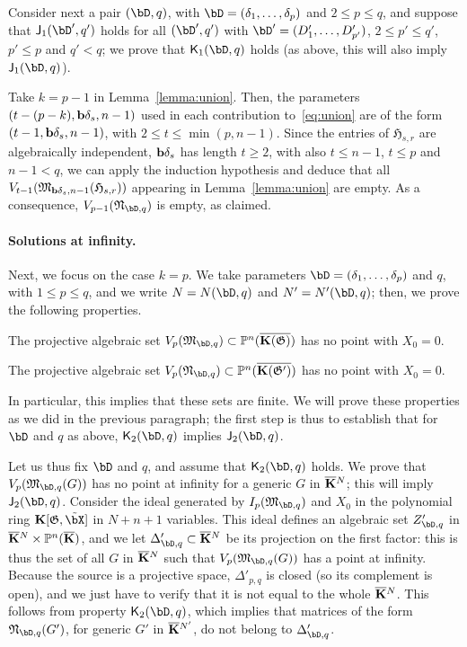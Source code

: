 \documentclass[12pt]{article}
\begin{document}
Consider next a pair $(\bD,q)$, with $\bD=(\delta_1,\dots,\delta_p)$ and $2 \le
p \le q$, and suppose that $\assI_1(\bD',q')$ holds for all
$(\bD',q')$ with $\bD'=(D'_1,\dots,D'_{p'})$, $2 \le p' \le q'$, $p'
\le p$ and $q' < q$; we prove that $\assJ_1(\bD,q)$ holds
(as above, this will also imply $\assI_1(\bD,q)$).

Take $k=p-1$ in Lemma~\ref{lemma:union}. Then, the parameters
$(t-(p-k),\mathbf{b}\delta_s,n-1)$ used in each contribution to~\eqref{eq:union}
are of the form $(t-1,\mathbf{b}\delta_s,n-1)$, with $2 \le t \le \min(p,n-1)$.
Since the entries of $\mathfrak{H}_{s,r}$ are algebraically
independent, $\mathbf{b}\delta_s$ has length $t\ge 2$, with also $t \le n-1$, $t
\le p$ and $n-1 < q$, we can apply the induction hypothesis and deduce
that all $V_{t-1}(\mathfrak{M}_{\mathbf{b}\delta_s,n-1}(\mathfrak{H}_{s,r}))$
appearing in Lemma~\ref{lemma:union} are empty. As a consequence,
$V_{p-1}(\mathfrak{N}_{\bD,q})$ is empty, as claimed.


\paragraph{Solutions at infinity.} Next, we focus on the case $k=p$.
We take parameters $\bD=(\delta_1,\dots,\delta_p)$ and $q$, with $1 \le p \le
q$, and we write $N=N(\bD,q)$ and $N'=N'(\bD,q)$; then, we prove the following properties.
\begin{description}[leftmargin=*]
\item[$\assI_2(\bD,q).$] The projective algebraic set
  $V_p(\mathfrak{M}_{\bD,q}) \subset \P^n(\KKGbar)$ has no point with $X_0=0$.
\item[$\assJ_2(\bD,q).$] The projective algebraic set
  $V_p(\mathfrak{N}_{\bD,q}) \subset \P^n(\KKGpbar)$ has no point with $X_0=0$.
\end{description}
 In particular, this implies that these sets are finite. We will prove
 these properties as we did in the previous paragraph; the first step
 is thus to establish that for $\bD$ and $q$ as above, $\assJ_2(\bD,q)$
 implies $\assI_2(\bD,q)$.

Let us thus fix $\bD$ and $q$, and assume that $\assJ_2(\bD,q)$
holds. We prove that $V_p(\mathfrak{M}_{\bD,q}(G))$ has no point at
infinity for a generic $G$ in $\overline{\mathbf{K}}{}^N$; this will imply $\assI_2(\bD,q)$. Consider the ideal generated by
$I_{p}(\mathfrak{M}_{\bD,q})$ and $X_0$ in the polynomial ring
$\KK[\mathfrak{G},\tilde\bX]$ in $N+n+1$ variables. This ideal defines
an algebraic set $Z'_{\bD,q}$ in $\overline{\mathbf{K}}{}^N \times \mathbb{P}^n(\overline{\mathbf{K}})$, and
we let $\Delta'_{\bD,q} \subset \KKbar{}^N$ be its projection on the
first factor: this is thus the set of all $G$ in $\overline{\mathbf{K}}{}^N$ such
that $V_p(\mathfrak{M}_{\bD,q}(G))$ has a point at infinity. Because
the source is a projective space, $\Delta'_{p,q}$ is closed (so its
complement is open), and we just have to verify that it is not equal
to the whole $\overline{\mathbf{K}}{}^N$. This follows from property $\assJ_2(\bD,q)$, which implies that matrices of the form
$\mathfrak{N}_{\bD,q}(G')$, for generic $G'$ in $\overline{\mathbf{K}}{}^{N'}$, do
not belong to $\Delta'_{\bD,q}$.
\end{document}
